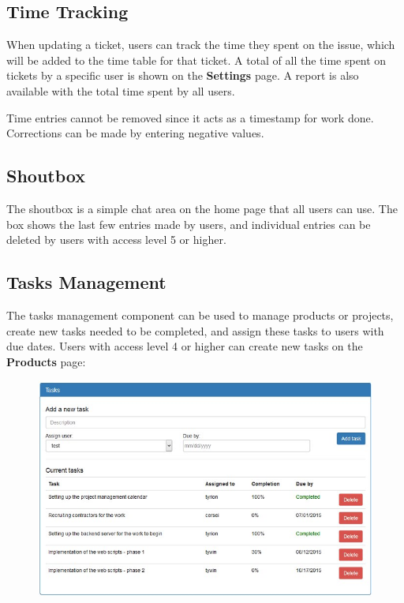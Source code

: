 \documentclass[11pt]{article}
\begin{document}
\subsection{Time Tracking}
When updating a ticket, users can track the time they spent on the issue, which will be added to the time table for that ticket. A total of all the time spent on tickets by a specific user is shown on the \textbf{Settings} page. A report is also available with the total time spent by all users.

Time entries cannot be removed since it acts as a timestamp for work done. Corrections can be made by entering negative values.

\subsection{Shoutbox}
The shoutbox is a simple chat area on the home page that all users can use. The box shows the last few entries made by users, and individual entries can be deleted by users with access level 5 or higher.

\subsection{Tasks Management}
The tasks management component can be used to manage products or projects, create new tasks needed to be completed, and assign these tasks to users with due dates. Users with access level 4 or higher can create new tasks on the \textbf{Products} page:

\begin{figure}[h]
\includegraphics{projectmanagement.jpg}
\end{figure}
\end{document}
